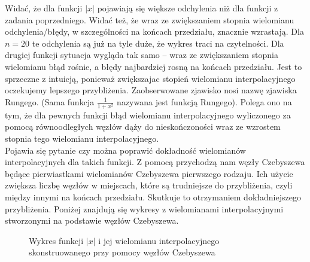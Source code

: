 \documentclass[]{article}
\begin{document}
Widać, że dla funkcji $|x|$ pojawiają się większe odchylenia niż dla funkcji z zadania poprzedniego. Widać też, że wraz ze zwiększaniem stopnia wielomianu odchylenia/błędy, w szczególności na końcach przedziału, znacznie wzrastają. Dla $n=20$ te odchylenia są już na tyle duże, że wykres traci na czytelności. Dla drugiej funkcji sytuacja wygląda tak samo -- wraz ze zwiększaniem stopnia wielomianu błąd rośnie, a błędy najbardziej rosną na końcach przedziału. Jest to sprzeczne z intuicją, ponieważ zwiększajac stopień wielomianu interpolacyjnego oczekujemy lepszego przybliżenia. Zaobserwowane zjawisko nosi nazwę zjawiska Rungego. (Sama funkcja $\frac{1}{1+x^2}$ nazywana jest funkcją Rungego). Polega ono na tym, że dla pewnych funkcji błąd wielomianu
interpolacyjnego wyliczonego za pomocą równoodległych węzłów dąży do nieskończoności wraz ze
wzrostem stopnia tego wielomianu interpolacyjnego.\\
Pojawia się pytanie czy można poprawić dokładność wielomianów interpolacyjnych dla takich funkcji. Z pomocą przychodzą nam węzły Czebyszewa będące pierwiastkami wielomianów Czebyszewa pierwszego rodzaju. Ich użycie zwiększa liczbę węzłów w miejscach, które są trudniejsze do przybliżenia, czyli między innymi na końcach przedziału. Skutkuje to otrzymaniem dokładniejszego przybliżenia. Poniżej znajdują się wykresy z wielomianami interpolacyjnymi stworzonymi na podstawie węzłów Czebyszewa.

\begin{figure}[h]
	\centering
	\caption*{Wykres funkcji $|x|$ i jej wielomianu interpolacyjnego skonstruowanego przy pomocy węzłów Czebyszewa}
	\label{fig:4}
\end{figure}
\end{document}

